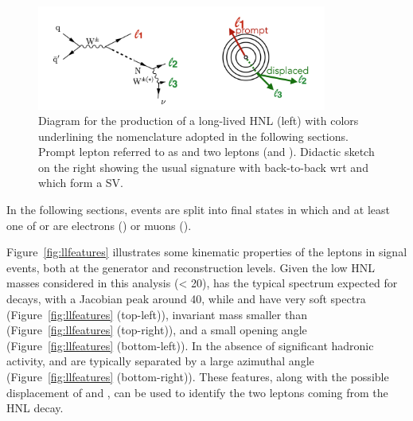 \begin{figure}[h]
\centering
\includegraphics[width=0.85\textwidth]{Figures/c6/llsketch}
\caption{Diagram for the production of a long-lived HNL (left) with colors
  underlining the nomenclature adopted in the following
  sections. Prompt lepton referred to as \lone and two \displ leptons (\ltwo and \lthree). Didactic sketch on the right showing the usual signature with
 \lone back-to-back wrt \ltwo and \lthree which form a SV.}
\label{fig:c6llsketch}
\end{figure}

In the following sections, events are split into  
final states in which \lone and at least one of \ltwo or \lthree are
electrons (\eex) or muons (\mmx).

Figure~\ref{fig:llfeatures} illustrates some
kinematic properties of the leptons in signal events, both at the
generator and reconstruction levels.
Given the low HNL masses considered in this analysis (\mhnl < 20\GeV),
\lone has the typical \pt spectrum expected for \PW decays, with a
Jacobian peak around 40\GeV,
while \ltwo and \lthree have very soft \pt spectra
(Figure~\ref{fig:llfeatures} (top-left)), invariant mass smaller than
\mhnl (Figure~\ref{fig:llfeatures} (top-right)), and a small opening angle
(Figure~\ref{fig:llfeatures} (bottom-left)).
In the absence of significant hadronic activity, \lone and \hnl are
typically separated by a large azimuthal angle
(Figure~\ref{fig:llfeatures} (bottom-right)).
These features, along with the possible displacement of \ltwo and
\lthree, can be used to identify the two leptons coming from the HNL
decay.

